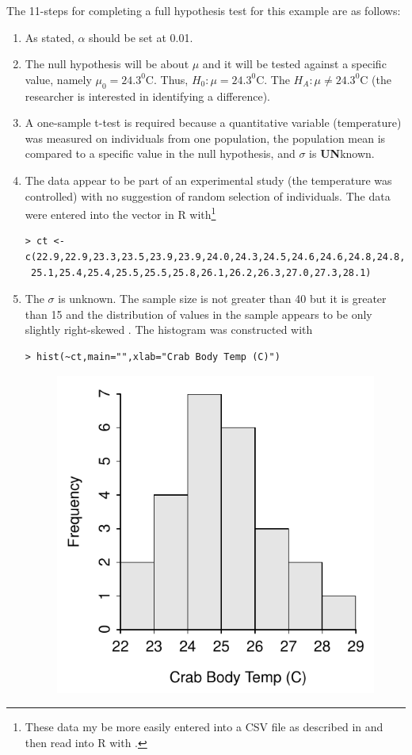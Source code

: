\documentclass[10pt,openany]{book}\usepackage[]{graphicx}\usepackage[]{color}
\makeatletter
\newenvironment{kframe}{%
 \def\at@end@of@kframe{}%
 \ifinner\ifhmode%
  \def\at@end@of@kframe{\end{minipage}}%
  \begin{minipage}{\columnwidth}%
 \fi\fi%
 \def\FrameCommand##1{\hskip\@totalleftmargin \hskip-\fboxsep
 \colorbox{shadecolor}{##1}\hskip-\fboxsep
     \hskip-\linewidth \hskip-\@totalleftmargin \hskip\columnwidth}%
 \MakeFramed {\advance\hsize-\width
   \@totalleftmargin\z@ \linewidth\hsize
   \@setminipage}}%
 {\par\unskip\endMakeFramed%
 \at@end@of@kframe}
\newenvironment{knitrout}{}{} %
\makeatother
\begin{document}
The 11-steps  for completing a full hypothesis test for this example are as follows:
\begin{enumerate}
    \item As stated, $\alpha$ should be set at 0.01.
    \item The null hypothesis will be about $\mu$ and it will be tested against a specific value, namely $\mu_{0}=24.3^{0}$C.  Thus, $H_{0}:\mu=24.3^{0}$C.  The $H_{A}:\mu\neq24.3^{0}$C (the researcher is interested in identifying a difference).
    \item A one-sample t-test is required because a quantitative variable (temperature) was measured on individuals from one population, the population mean is compared to a specific value in the null hypothesis, and $\sigma$ is \textbf{UN}known.
    \item The data appear to be part of an experimental study (the temperature was controlled) with no suggestion of random selection of individuals.  The data were entered into the  vector in R with\footnote{These data my be more easily entered into a CSV file as described in  and then read into R with .}
\begin{knitrout}
\color{fgcolor}\begin{kframe}
\begin{verbatim}
> ct <- c(22.9,22.9,23.3,23.5,23.9,23.9,24.0,24.3,24.5,24.6,24.6,24.8,24.8,
 25.1,25.4,25.4,25.5,25.5,25.8,26.1,26.2,26.3,27.0,27.3,28.1)
\end{verbatim}
\end{kframe}
\end{knitrout}
    \item The $\sigma$ is unknown.  The sample size is not greater than 40 but it is greater than 15 and the distribution of values in the sample appears to be only slightly right-skewed .  The histogram was constructed with
\begin{knitrout}
\color{fgcolor}\begin{kframe}
\begin{verbatim}
> hist(~ct,main="",xlab="Crab Body Temp (C)")
\end{verbatim}
\end{kframe}\begin{figure}[hbtp]

{\centering \includegraphics[width=.3\linewidth]{Figs/CrabTempHist-1} 

}
\end{figure}
\end{knitrout}
\end{enumerate}
\end{document}
